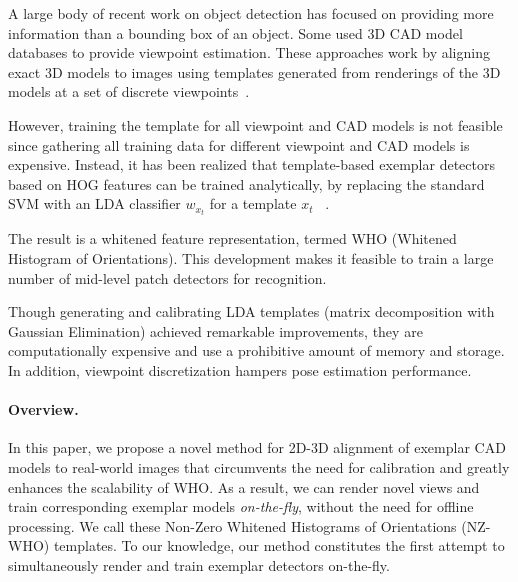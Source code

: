 \documentclass[extendedabs]{bmvc2k}
\begin{document}

\noindent
A large body of recent work on object detection has focused on providing more
information than a bounding box of an object. Some used 3D CAD
model databases to provide viewpoint estimation. These approaches work
by aligning exact 3D models to images using templates generated from renderings
of the 3D models at a set of discrete viewpoints~\cite{Aubry14}.

However, training the template for all viewpoint and CAD models is not feasible
since gathering all training data for different viewpoint and CAD models is
expensive.  Instead, it has been realized that template-based exemplar
detectors based on HOG features can be trained analytically, by
replacing the standard SVM with an LDA classifier $w_{x_t}$ for a template $x_t$
~\cite{Hariharan12}.

The result is a whitened feature representation, termed WHO (Whitened Histogram
of Orientations). This development makes it feasible to train a large number of
mid-level patch detectors for recognition.

Though generating and calibrating LDA templates (matrix decomposition with
Gaussian Elimination) achieved remarkable improvements, they are
computationally expensive and use a prohibitive amount of memory and storage.
In addition, viewpoint discretization hampers pose estimation performance.



\vspace{-0.15in}
\paragraph{Overview.} In this paper, we propose a novel method for 2D-3D
alignment of exemplar CAD models to real-world images that circumvents the need
for calibration and greatly enhances the scalability of WHO. As a result, we
can render novel views and train corresponding exemplar models {\em
	on-the-fly}, without the need for offline processing. We call these Non-Zero
Whitened Histograms of Orientations (NZ-WHO) templates. To our knowledge, our
method constitutes the first attempt to simultaneously render and train
exemplar detectors on-the-fly.
\end{document}

